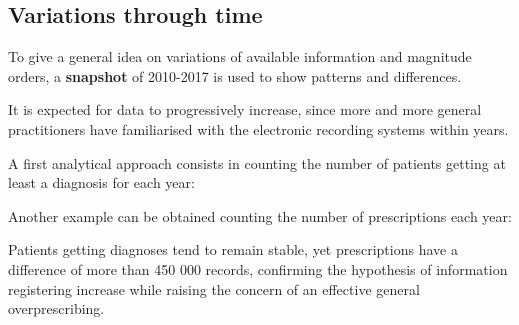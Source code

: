\subsection{Variations through time}
To give a general idea on variations of available information and magnitude orders, a \textbf{snapshot} of 2010-2017 is used to show patterns and differences.

It is expected for data to progressively increase, since more and more general practitioners have familiarised with the electronic recording systems within years.

A first analytical approach consists in counting the number of patients getting at least a diagnosis for each year:
\begin{table}[h]
	\centering
\caption{\small Number of patients with diagnoses}
\vspace{-10px}
\end{table}
\bigskip

Another example can be obtained counting the number of prescriptions each year:
\begin{table}[h]
	\centering
\caption{\small Number of patients with prescriptions}
\end{table}

Patients getting diagnoses tend to remain stable, yet prescriptions have a difference of more than 450 000 records, confirming the hypothesis of information registering increase while raising the concern of an effective general overprescribing.
